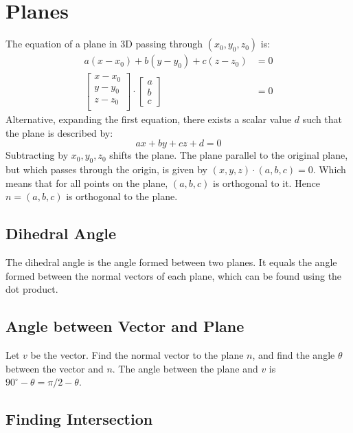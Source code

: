 \documentclass{article}
\begin{document}
\section{Planes}

The equation of a plane in 3D passing through $(x_0,y_0,z_0)$ is:
\begin{align*}
	a(x-x_0)+b(y-y_0)+c(z-z_0)&=0 \\
	\begin{bmatrix}
		x-x_0 \\
		y-y_0 \\
		z-z_0 \\
	\end{bmatrix}
	\cdot \begin{bmatrix}
		a \\ b \\ c
	\end{bmatrix}
	&=0
\end{align*}
Alternative, expanding the first equation, there exists a scalar value $d$ such that the plane is described by:
\begin{equation*}
	ax+by+cz+d=0
\end{equation*}
Subtracting by $x_0,y_0,z_0$ shifts the plane. The plane parallel to the original plane, but which passes through the origin, is given by $(x,y,z)\cdot(a,b,c)=0$. Which means that for all points on the plane, $(a,b,c)$ is orthogonal to it. Hence $n=(a,b,c)$ is orthogonal to the plane.

\subsection{Dihedral Angle}

The dihedral angle is the angle formed between two planes. It equals the angle formed between the normal vectors of each plane, which can be found using the dot product.

\subsection{Angle between Vector and Plane}

Let $v$ be the vector. Find the normal vector to the plane $n$, and find the angle $\theta$ between the vector and $n$. The angle between the plane and $v$ is $90^\circ-\theta=\pi/2-\theta$.

\subsection{Finding Intersection}
\end{document}
